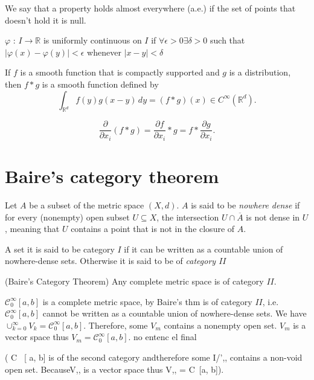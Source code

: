 \documentclass[../main.tex]{subfiles}
\begin{document}
\begin{definition}
We say that a property holds almost everywhere (a.e.) if the set of points that doesn’t hold it is null.
\end{definition}


\begin{definition} 
	$\varphi$ : $I \rightarrow \mathbb{R}$ is uniformly continuous on $I$ if $\forall \epsilon > 0 \exists \delta >0 $ such that $|\varphi(x)- \varphi(y)| < \epsilon$ whenever $|x-y|< \delta$
\end{definition}

\begin{propo}
	If $f$ is a smooth function that is compactly supported and $g$ is a distribution, then $f\ast g$ is a smooth function defined by
	$${\displaystyle \int _{\mathbb {R} ^{d}}{f}(y)g(x-y)\,dy=(f*g)(x)\in C^{\infty }(\mathbb {R} ^{d}).} $$ \label{prop:29}
\end{propo}
\begin{propo} \label{prop:2}
	$${\frac {\partial }{\partial x_{i}}}(f*g)={\frac {\partial f}{\partial x_{i}}}*g=f*{\frac {\partial g}{\partial x_{i}}}.$$
\end{propo}

\section{Baire's category theorem} \label{baire}

\begin{definition} Let $A$ be a subset of the metric space $(X,d)$. $A$ is said to be \emph{nowhere dense} if for every (nonempty) open subset $U\subseteq X$, the intersection $U\cap\overline{A}$ is not dense in $U$, meaning that $U$ contains a point that is not in the closure of $A$.
\end{definition}

\begin{definition}
	A set it is said to be category $I$ if it can be written as a countable union of nowhere-dense sets. Otherwise it is said to be of \emph{category $II$}
\end{definition}
\begin{theorem} (Baire's Category Theorem)
	Any complete metric space is of category $II$.
\end{theorem}
\noindent $\mathcal{C}_0^\infty[a,b]$ is a complete metric space,  by Baire's thm is of category $II$, i.e. $\mathcal{C}_0^\infty[a,b]$  cannot be written as a countable union of nowhere-dense sets. We have $\cup_{k=0}^\infty V_k = \mathcal{C}_0^\infty[a,b]$. Therefore, some $V_m$ contains a nonempty open set. $V_m$ is a vector space thus $V_m=\mathcal{C}_0^\infty[a,b]$. no entenc el final




( C~ [ a, b] is of the second category andtherefore some I/',, contains a non-void open set. BecauseV,, is a vector space thus V,, = C~[a, b]).
\end{document}
